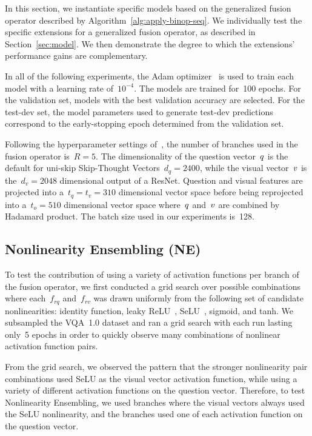 In this section, we instantiate specific models based on the generalized fusion
operator described by Algorithm~\ref{alg:apply-binop-seq}. We individually
test the specific extensions for a generalized fusion operator, as described in
Section~\ref{sec:model}. We then demonstrate the degree to which the
extensions' performance gains are complementary.

In all of the following experiments, the Adam
optimizer~\citep{kingma2014adam} is used to train each model with a learning
rate of~$10^{-4}$. The models are trained for~\num{100} epochs. For the validation
set, models with the best validation accuracy are selected. For the test-dev
set, the model parameters used to generate test-dev predictions correspond to
the early-stopping epoch determined from the validation set.

Following the hyperparameter settings of~\citet{ben2017mutan}, the number of
branches used in the fusion operator is~$R = 5$. The dimensionality of the
question vector~$q$ is the default for uni-skip Skip-Thought Vectors~$d_q =
2400$, while the visual vector~$v$ is the~$d_v = 2048$ dimensional output of a
ResNet.  Question and visual features are projected into a~$t_q = t_v = 310$
dimensional vector space before being reprojected into a~$t_o = 510$
dimensional vector space where~$q$ and~$v$ are combined by Hadamard product.
The batch size used in our experiments is~\num{128}.


\subsection{Nonlinearity Ensembling (NE)}

To test the contribution of using a variety of activation functions per branch
of the fusion operator, we first conducted a grid search over possible
combinations where each~$f_{rq}$ and~$f_{rv}$ was drawn uniformly from the
following set of candidate nonlinearities: identity function, leaky
ReLU~\citep{maas_rectified_nonlinearities},
SeLU~\citep{klambauer2017self}, sigmoid, and tanh. We subsampled the VQA~1.0
dataset and ran a grid search with each run lasting only~\num{5} epochs in
order to quickly observe many combinations of nonlinear activation function
pairs.

From the grid search, we observed the pattern that the stronger nonlinearity
pair combinations used SeLU as the visual vector activation function, while
using a variety of different activation functions on the question vector.
Therefore, to test Nonlinearity Ensembling, we used branches where the visual
vectors always used the SeLU nonlinearity, and the branches used one of each
activation function on the question vector.

